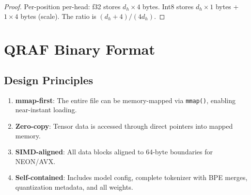 \documentclass[12pt,a4paper]{article}
\begin{document}
\begin{proof}
Per-position per-head: f32 stores $d_h \times 4$ bytes. Int8 stores $d_h \times 1$ bytes + $1 \times 4$ bytes (scale). The ratio is $(d_h + 4)/(4d_h)$.
\end{proof}

\section{QRAF Binary Format}
\label{sec:format}

\subsection{Design Principles}

\begin{enumerate}[leftmargin=*]
    \item \textbf{mmap-first}: The entire file can be memory-mapped via \texttt{mmap()}, enabling near-instant loading.
    \item \textbf{Zero-copy}: Tensor data is accessed through direct pointers into mapped memory.
    \item \textbf{SIMD-aligned}: All data blocks aligned to 64-byte boundaries for NEON/AVX.
    \item \textbf{Self-contained}: Includes model config, complete tokenizer with BPE merges, quantization metadata, and all weights.
\end{enumerate}
\end{document}
